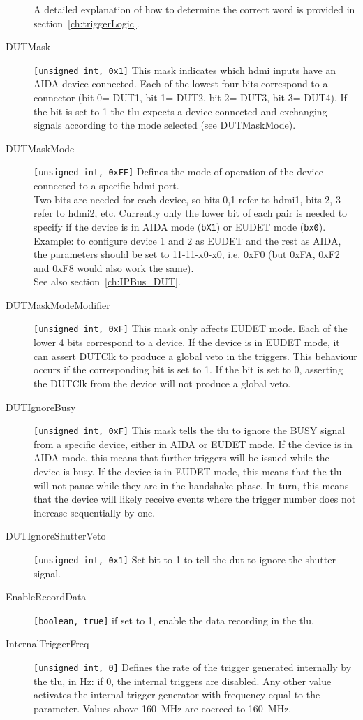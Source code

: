 \begin{description}
        A detailed explanation of how to determine the correct word is provided in section~\ref{ch:triggerLogic}.
  \item[DUTMask]  \verb|[unsigned int, 0x1]| This mask indicates which \gls{hdmi} inputs have an AIDA device connected. Each of the lowest four bits correspond to a connector (bit 0= DUT1, bit 1= DUT2, bit 2= DUT3, bit 3= DUT4). If the bit is set to 1 the \gls{tlu} expects a device connected and exchanging signals according to the mode selected (see DUTMaskMode).
  \item[DUTMaskMode]  \verb|[unsigned int, 0xFF]| Defines the mode of operation of the device connected to a specific \gls{hdmi} port.\\
        Two bits are needed for each device, so bits 0,1 refer to \gls{hdmi}1, bits 2, 3 refer to \gls{hdmi}2, etc. Currently only the lower bit of each pair is needed to specify if the device is in AIDA mode (\texttt{bX1}) or EUDET mode (\texttt{bx0}).\\
        Example: to configure device 1 and 2 as EUDET and the rest as AIDA, the parameters should be set to 11-11-x0-x0, i.e. 0xF0 (but 0xFA, 0xF2 and 0xF8 would also work the same).\\
        See also section~\ref{ch:IPBus_DUT}.
  \item[DUTMaskModeModifier] \verb|[unsigned int, 0xF]| This mask only affects EUDET mode. Each of the lower 4 bits correspond to a device. If the device is in EUDET mode, it can assert DUTClk to produce a global veto in the triggers. This behaviour occurs if the corresponding bit is set to 1. If the bit is set to 0, asserting the DUTClk from the device will not produce a global veto.
  \item[DUTIgnoreBusy] \verb|[unsigned int, 0xF]| This mask tells the \gls{tlu} to ignore the BUSY signal from a specific device, either in AIDA or EUDET mode. If the device is in AIDA mode, this means that further triggers will be issued while the device is busy. If the device is in EUDET mode, this means that the \gls{tlu} will not pause while they are in the handshake phase. In turn, this means that the device will likely receive events where the trigger number does not increase sequentially by one.
  \item[DUTIgnoreShutterVeto] \verb|[unsigned int, 0x1]| Set bit to 1 to tell the \gls{dut} to ignore the shutter signal.
  \item[EnableRecordData] \verb|[boolean, true]| if set to 1, enable the data recording in the \gls{tlu}.
  \item[InternalTriggerFreq] \verb|[unsigned int, 0]| Defines the rate of the trigger generated internally by the \gls{tlu}, in Hz: if 0, the internal triggers are disabled. Any other value activates the internal trigger generator with frequency equal to the parameter. Values above 160~MHz are coerced to 160~MHz.
\end{description} 